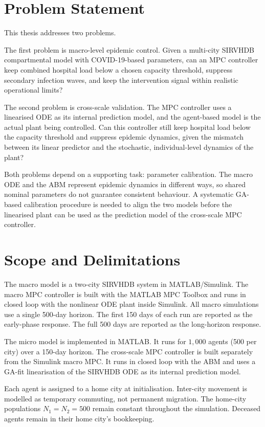 \section{Problem Statement}
\label{sec:problem}

This thesis addresses two problems.

The first problem is macro-level epidemic control.
Given a multi-city SIRVHDB compartmental model with COVID-19-based parameters, can an MPC controller keep combined hospital load below a chosen capacity threshold, suppress secondary infection waves, and keep the intervention signal within realistic operational limits?

The second problem is cross-scale validation.
The MPC controller uses a linearised ODE as its internal prediction model, and the agent-based model is the actual plant being controlled.
Can this controller still keep hospital load below the capacity threshold and suppress epidemic dynamics, given the mismatch between its linear predictor and the stochastic, individual-level dynamics of the plant?

Both problems depend on a supporting task: parameter calibration.
The macro ODE and the ABM represent epidemic dynamics in different ways, so shared nominal parameters do not guarantee consistent behaviour.
A systematic GA-based calibration procedure is needed to align the two models before the linearised plant can be used as the prediction model of the cross-scale MPC controller.

\section{Scope and Delimitations}
\label{sec:scope}

The macro model is a two-city SIRVHDB system in MATLAB/Simulink.
The macro MPC controller is built with the MATLAB MPC Toolbox and runs in closed loop with the nonlinear ODE plant inside Simulink.
All macro simulations use a single 500-day horizon.
The first 150 days of each run are reported as the early-phase response.
The full 500 days are reported as the long-horizon response.

The micro model is implemented in MATLAB.
It runs for $1{,}000$ agents (500 per city) over a 150-day horizon.
The cross-scale MPC controller is built separately from the Simulink macro MPC.
It runs in closed loop with the ABM and uses a GA-fit linearisation of the SIRVHDB ODE as its internal prediction model.

Each agent is assigned to a home city at initialisation.
Inter-city movement is modelled as temporary commuting, not permanent migration.
The home-city populations $N_1 = N_2 = 500$ remain constant throughout the simulation.
Deceased agents remain in their home city's bookkeeping.

